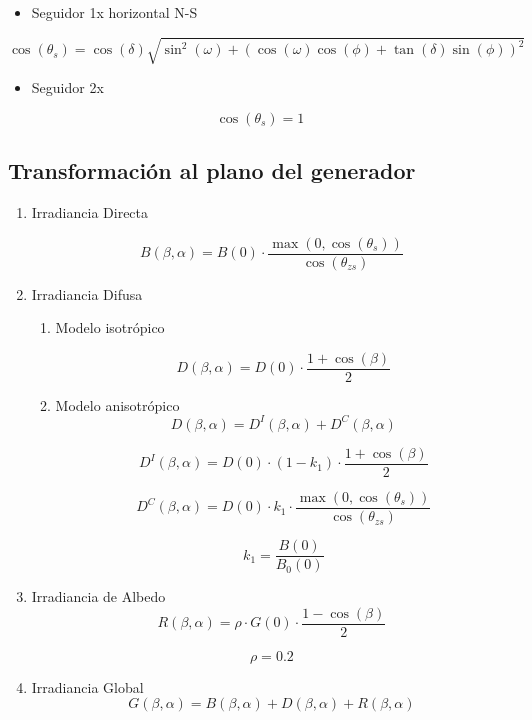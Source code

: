 \documentclass[article, a4paper]{memoir}
\begin{document}
\begin{itemize}
\item Seguidor 1x horizontal N-S
\end{itemize}
\[\cos(\theta_{s})=\cos(\delta)\sqrt{\sin^{2}(\omega)+\left(\cos(\omega)\cos(\phi)+\tan(\delta)\sin(\phi)\right)^{2}}\]

\begin{itemize}
\item Seguidor 2x
\end{itemize}
\[
  \cos(\theta_{s}) = 1
\]

\subsection{Transformación al plano del generador}
\label{sec:org9212c18}


\begin{enumerate}
\item Irradiancia Directa
\label{sec:org66a7e7e}

\[B(\beta,\alpha)=B(0)\cdot\frac{\max(0,\cos(\theta_{s}))}{\cos(\theta_{zs})}\]

\item Irradiancia Difusa
\label{sec:orgb25fb8f}

\begin{enumerate}
\item Modelo isotrópico
\label{sec:orga736705}

\[D(\beta,\alpha)=D(0)\cdot\frac{1+\cos(\beta)}{2}\]


\item Modelo anisotrópico
\label{sec:org3ab212a}
\[D(\beta,\alpha) = D^{I}(\beta,\alpha)+D^{C}(\beta,\alpha)\]

\[D^{I}(\beta,\alpha) = D(0) \cdot (1-k_{1}) \cdot \frac{1 + \cos(\beta)}{2}\]

\[D^{C}(\beta,\alpha) = D(0) \cdot k_{1} \cdot \frac{\max(0,\cos(\theta_{s}))}{\cos(\theta_{zs})}\]

\[k_{1} = \frac{B(0)}{B_{0}(0)}\]
\end{enumerate}

\item Irradiancia de Albedo
\label{sec:org15df90b}
\[R(\beta,\alpha)=\rho\cdot G(0)\cdot\frac{1-\cos(\beta)}{2}\]

\[\rho=0.2\]

\item Irradiancia Global
\label{sec:orga0b2eeb}
\[
G(\beta, \alpha) = B(\beta, \alpha) + D(\beta, \alpha) + R(\beta, \alpha)
\]
\end{enumerate}
\end{document}
